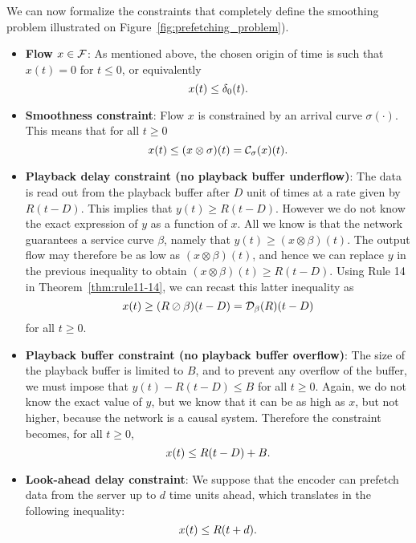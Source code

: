 We can now formalize the constraints that completely define the smoothing problem illustrated on Figure~\ref{fig:prefetching_problem}).

\begin{itemize}
\item{\bf Flow $x \in \mathcal F$}: As mentioned above, the chosen origin of time is such that
$x(t) = 0$ for $t \leq 0$, or equivalently
\begin{equation}
\mylabel{eq:causalflow}
x(t) \leq \delta_0 (t).
\end{equation}

\item{\bf Smoothness constraint}: Flow $x$ is constrained by an
arrival curve $\sigma (\cdot) $. %
This means that for all $t \geq 0$
\begin{equation}
\mylabel{eq:smoothnessminplus}
x(t) \leq (x \otimes \sigma)(t) = \calC_{\sigma}(x)(t).
\end{equation}


\item {\bf Playback delay constraint (no playback buffer underflow)}:
The data is read out from the playback buffer after $D$ unit of times
at a rate given by $R(t - D) $. This implies that $y(t) \geq R(t-D)$.
However we do not know the exact expression of $y$ as a function of $x$.
All we know is that the network  guarantees a service curve $\beta$, namely that
$y(t) \geq (x \otimes \beta)(t)$.
The output flow may therefore be as low as $(x \otimes \beta)(t)$,
and hence we can replace $y$ in the previous inequality to obtain $(x \otimes \beta) (t) \geq  R(t-D)$.
Using Rule 14 in Theorem~\ref{thm:rule11-14}, we can recast this latter inequality as
\begin{equation}
\mylabel{eq:playbackdelay}
x(t) \geq (R \oslash \beta)(t - D) = \calD_{\beta}(R)(t-D)
\end{equation}
for all $t \geq 0$.

\item{\bf Playback buffer constraint (no playback buffer overflow)}:
The size of the playback buffer is limited to $B$, and to prevent any overflow of the buffer,
we must impose that $y(t) -  R(t-D) \leq B$ for all $t \geq 0$. Again, we do not know the
exact value of  $y$, but we know that it can be as high as  $x$, but not higher,
because the network is a causal system. Therefore the constraint becomes, for all $t \geq 0$,
\begin{equation}
\mylabel{eq:playbackbuffer}
x(t) \leq R(t - D) + B.
\end{equation}

\item {\bf Look-ahead delay constraint}:
We suppose that the encoder can prefetch data from the server up to $d$ time units ahead, which translates
in the following inequality:
\begin{equation}
\mylabel{eq:prefetchingdelay}
x(t) \leq  R(t+d).
\end{equation}

\end{itemize}


